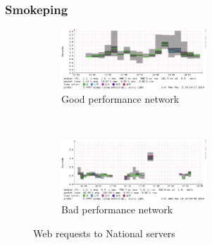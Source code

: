 \begin{frame}
	\frametitle{Smokeping}
	\begin{figure} 
		\begin{subfigure}{\textwidth} 
			\centering 
			\includegraphics[width=0.6\textwidth]{img/smoke_inf_good}
			\caption[Smokeping: Web requests with good performance]{Good performance network}
		\end{subfigure}%
		\\ 
		\begin{subfigure}{\textwidth} 
			\centering 
			\includegraphics[width=0.6\textwidth]{img/smoke_inf_bad}
			\caption[Smokeping: Web requests with bad performance]{Bad performance network}
		\end{subfigure}
		\caption[Smokeping: Web requests to National servers]{Web requests to National servers}

	\end{figure} 
\end{frame}


